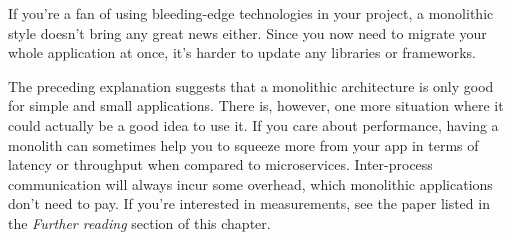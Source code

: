 If you're a fan of using bleeding-edge technologies in your project, a monolithic style doesn't bring any great news either. Since you now need to migrate your whole application at once, it's harder to update any libraries or frameworks.

The preceding explanation suggests that a monolithic architecture is only good for simple and small applications. There is, however, one more situation where it could actually be a good idea to use it. If you care about performance, having a monolith can sometimes help you to squeeze more from your app in terms of latency or throughput when compared to microservices. Inter-process communication will always incur some overhead, which monolithic applications don't need to pay. If you're interested in measurements, see the paper listed in the \textit{Further reading} section of this chapter.






















